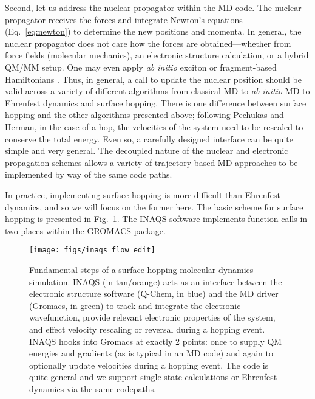 \documentclass[journal=jctcce,manuscript=article,layout=traditional]{achemso}
\newcommand{\fig}[1]{Fig.~\ref{#1}}
\newcommand{\refeq}[1]{Eq.~\ref{#1}}
\begin{document}
Second, let us address the nuclear propagator within the MD code.
The nuclear propagator receives the forces and  integrate Newton's equations (\refeq{eq:newton}) to determine the new positions and momenta.
In general,  the nuclear propagator does not care how the forces are obtained---whether from force fields (molecular mechanics), an electronic structure calculation, or a hybrid QM/MM setup.
One may even apply \emph{ab initio} exciton or fragment-based Hamiltonians \cite{Sisto2014, Sisto2017, Menger2018, persico2021}.
Thus, in general, a call to update the nuclear position
%
should be valid across a variety of different algorithms from classical MD to \emph{ab initio} MD to Ehrenfest dynamics and surface hopping.
There is  one difference between surface hopping and the other algorithms presented above; following Pechukas\cite{pechukas:1969:pr} and Herman\cite{herman:1984:jcp:rescaling_direction}, in the case of a hop, the velocities of the system need to be rescaled to conserve the total energy. Even so, a carefully designed interface can be quite simple and very general.
The decoupled nature of the  nuclear and electronic propagation schemes allows a variety of trajectory-based MD approaches to be implemented by way of the same code paths.
%
%


In practice, implementing surface hopping is more difficult than Ehrenfest dynamics, and so we will focus on the former here.  The basic scheme for surface hopping is presented in \fig{fig:inaqsflow}.
The INAQS software implements function calls in two places within the GROMACS package.


\begin{figure}
    \centering
    \texttt{[image: figs/inaqs\_flow\_edit]}
    \caption{Fundamental steps of a surface hopping molecular dynamics simulation. INAQS (in tan/orange) acts as an interface between the electronic structure software (Q-Chem, in blue) and the MD driver (Gromacs, in green) to track and integrate the electronic wavefunction, provide relevant electronic properties of the system, and effect velocity rescaling or reversal during a hopping event. INAQS hooks into Gromacs at exactly 2 points: once to supply QM energies and gradients (as is typical in an MD code) and again to optionally update velocities during a hopping event. The code is quite general and we support single-state calculations or Ehrenfest dynamics via the same codepaths.
    }
    \label{fig:inaqsflow}
\end{figure}
\end{document}
